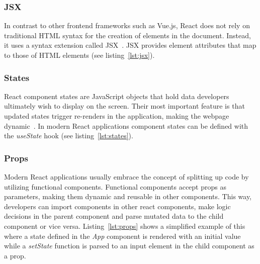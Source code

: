 \subsubsection{JSX}\label{subsubsec:jsx}

In contrast to other frontend frameworks such as Vue.js, React does not rely on traditional \gls{HTML} syntax for the creation of elements in the document.
Instead, it uses a syntax extension called \gls{JSX}~\autocite{meta_platforms_inc_react_2022}.
\gls{JSX} provides element attributes that map to those of \gls{HTML} elements (see listing~\ref{lst:jsx}).


\subsubsection{States}\label{subsubsec:states}

React component states are JavaScript objects that hold data developers ultimately wish to display on the screen.
Their most important feature is that updated states trigger re-renders in the application, making the webpage dynamic~\autocite{meta_platforms_inc_react_2022}.
In modern React applications component states can be defined with the \emph{useState} hook (see listing~\ref{lst:states}).


\subsubsection{Props}\label{subsubsec:props}

Modern React applications usually embrace the concept of splitting up code by utilizing functional components.
Functional components accept \glspl{prop} as parameters, making them dynamic and reusable in other components.
This way, developers can import components in other react components, make logic decisions in the parent component and parse mutated data to the child component or vice versa.
Listing~\ref{lst:props} shows a simplified example of this where a state defined in the \emph{App} component is rendered with an initial value while a \emph{setState} function is parsed to an input element in the child component as a \gls{prop}.


